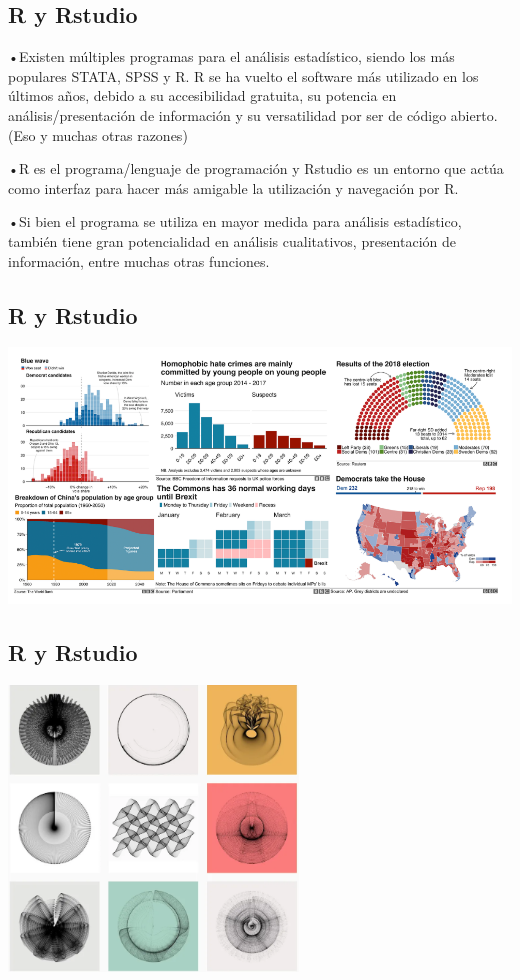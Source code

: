 \documentclass[
]{article}
\begin{document}
\subsection{R y Rstudio}\label{r-y-rstudio}

•Existen múltiples programas para el análisis estadístico, siendo los
más populares STATA, SPSS y R. R se ha vuelto el software más utilizado
en los últimos años, debido a su accesibilidad gratuita, su potencia en
análisis/presentación de información y su versatilidad por ser de código
abierto. (Eso y muchas otras razones)

•R es el programa/lenguaje de programación y Rstudio es un entorno que
actúa como interfaz para hacer más amigable la utilización y navegación
por R.

•Si bien el programa se utiliza en mayor medida para análisis
estadístico, también tiene gran potencialidad en análisis cualitativos,
presentación de información, entre muchas otras funciones.

\subsection{R y Rstudio}\label{r-y-rstudio-1}

\includegraphics[width=5.625in,height=\textheight]{GrafR.png}

\subsection{R y Rstudio}\label{r-y-rstudio-2}

\includegraphics[width=3.03125in,height=\textheight]{ArteR.png}
\end{document}
